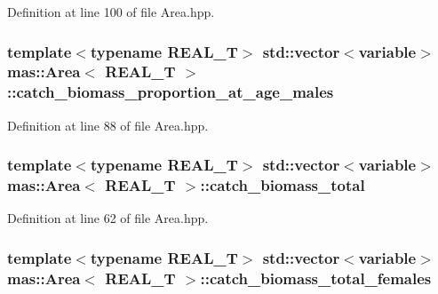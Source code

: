 Definition at line 100 of file Area.\-hpp.

\hypertarget{structmas_1_1_area_aea1735e78135761b1308da0eaf619338}{
\subsubsection[{catch\-\_\-biomass\-\_\-proportion\-\_\-at\-\_\-age\-\_\-males}]{\setlength{\rightskip}{0pt plus 5cm}template$<$typename R\-E\-A\-L\-\_\-\-T$>$ std\-::vector$<${\bf variable}$>$ {\bf mas\-::\-Area}$<$ R\-E\-A\-L\-\_\-\-T $>$\-::catch\-\_\-biomass\-\_\-proportion\-\_\-at\-\_\-age\-\_\-males}}\label{structmas_1_1_area_aea1735e78135761b1308da0eaf619338}


Definition at line 88 of file Area.\-hpp.

\hypertarget{structmas_1_1_area_ad9a5d453e1aa68aee982bb93738a24b4}{
\subsubsection[{catch\-\_\-biomass\-\_\-total}]{\setlength{\rightskip}{0pt plus 5cm}template$<$typename R\-E\-A\-L\-\_\-\-T$>$ std\-::vector$<${\bf variable}$>$ {\bf mas\-::\-Area}$<$ R\-E\-A\-L\-\_\-\-T $>$\-::catch\-\_\-biomass\-\_\-total}}\label{structmas_1_1_area_ad9a5d453e1aa68aee982bb93738a24b4}


Definition at line 62 of file Area.\-hpp.

\hypertarget{structmas_1_1_area_a65e5b1f37aa45c18d0eefcabd88bf504}{
\subsubsection[{catch\-\_\-biomass\-\_\-total\-\_\-females}]{\setlength{\rightskip}{0pt plus 5cm}template$<$typename R\-E\-A\-L\-\_\-\-T$>$ std\-::vector$<${\bf variable}$>$ {\bf mas\-::\-Area}$<$ R\-E\-A\-L\-\_\-\-T $>$\-::catch\-\_\-biomass\-\_\-total\-\_\-females}}\label{structmas_1_1_area_a65e5b1f37aa45c18d0eefcabd88bf504}


